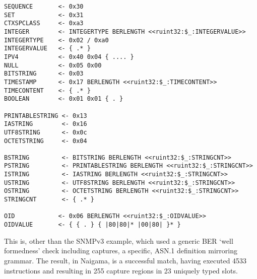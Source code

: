 \begin{changemargin}{-60mm}{0mm}
\begin{myquote}
\begin{verbatim}
SEQUENCE       <- 0x30
SET            <- 0x31
CTXSPCLASS     <- 0xa3
INTEGER        <- INTEGERTYPE BERLENGTH <<ruint32:$_:INTEGERVALUE>>
INTEGERTYPE    <- 0x02 / 0xa0
INTEGERVALUE   <- { .* }
IPV4           <- 0x40 0x04 { .... }
NULL           <- 0x05 0x00
BITSTRING      <- 0x03
TIMESTAMP      <- 0x17 BERLENGTH <<ruint32:$_:TIMECONTENT>>
TIMECONTENT    <- { .* }
BOOLEAN        <- 0x01 0x01 { . }

PRINTABLESTRING <- 0x13
IASTRING        <- 0x16
UTF8STRING      <- 0x0c
OCTETSTRING     <- 0x04

BSTRING         <- BITSTRING BERLENGTH <<ruint32:$_:STRINGCNT>>
PSTRING         <- PRINTABLESTRING BERLENGTH <<ruint32:$_:STRINGCNT>>
ISTRING         <- IASTRING BERLENGTH <<ruint32:$_:STRINGCNT>>
USTRING         <- UTF8STRING BERLENGTH <<ruint32:$_:STRINGCNT>>
OSTRING         <- OCTETSTRING BERLENGTH <<ruint32:$_:STRINGCNT>>
STRINGCNT       <- { .* }

OID            <- 0x06 BERLENGTH <<ruint32:$_:OIDVALUE>>
OIDVALUE       <- { { . } { |80|80|* |00|80| }* }
\end{verbatim}
\end{myquote}
\end{changemargin}

This is, other than the SNMPv3 example, which used a generic BER ‘well 
formedness’ check including captures, a specific, ASN.1 definition 
mirroring grammar. The result, in Naigama, is a successful match, having 
executed 4533 instructions and resulting in 255 capture regions in 23 
uniquely typed slots.
